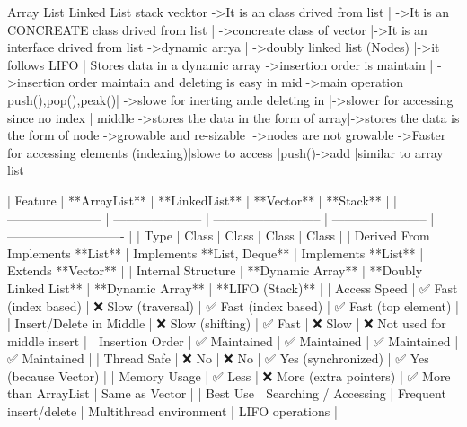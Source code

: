 {{{{{{{{Array List                                         Linked List                               stack                               vecktor
->It is an class drived from list | ->It is an CONCREATE class drived from list | ->concreate class of vector |->It is an interface drived from list
->dynamic arrya                       | ->doubly linked list  (Nodes)                |->it follows LIFO  | Stores data in a dynamic array
->insertion order is maintain         | ->insertion order maintain and deleting is easy in mid|->main operation push(),pop(),peak()|
->slowe for inerting ande deleting in |->slower for accessing since no index   |
middle
->stores the data in the form of array|->stores the data is the form of node
->growable and re-sizable             |->nodes are not growable
->Faster for accessing elements (indexing)|slowe to access                   |push()->add         |similar to array list


| Feature                 | **ArrayList**         | **LinkedList**             | **Vector**              | **Stack**                    |
| ----------------------- | --------------------- | -------------------------- | ----------------------- | ---------------------------- |
| Type                    | Class                 | Class                      | Class                   | Class                        |
| Derived From            | Implements **List**   | Implements **List, Deque** | Implements **List**     | Extends **Vector**           |
| Internal Structure      | **Dynamic Array**     | **Doubly Linked List**     | **Dynamic Array**       | **LIFO (Stack)**             |
| Access Speed            | ✅ Fast (index based)  | ❌ Slow (traversal)         | ✅ Fast (index based)    | ✅ Fast (top element)         |
| Insert/Delete in Middle | ❌ Slow (shifting)     | ✅ Fast                     | ❌ Slow                  | ❌ Not used for middle insert |
| Insertion Order         | ✅ Maintained          | ✅ Maintained               | ✅ Maintained            | ✅ Maintained                 |
| Thread Safe             | ❌ No                  | ❌ No                       | ✅ Yes (synchronized)    | ✅ Yes (because Vector)       |
| Memory Usage            | ✅ Less                | ❌ More (extra pointers)    | ✅ More than ArrayList   | Same as Vector               |
| Best Use                | Searching / Accessing | Frequent insert/delete     | Multithread environment | LIFO operations              |

}}}}}}}}
